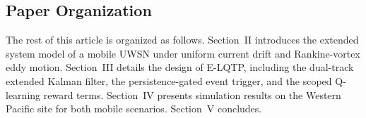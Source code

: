 \subsection{Paper Organization}
The rest of this article is organized as follows.
Section~II introduces the extended system model of a mobile UWSN
under uniform current drift and Rankine-vortex eddy motion.
Section~III details the design of E-LQTP, including the dual-track
extended Kalman filter, the persistence-gated event trigger, and the
scoped Q-learning reward terms.
Section~IV presents simulation results on the Western Pacific site
for both mobile scenarios.
Section~V concludes.
